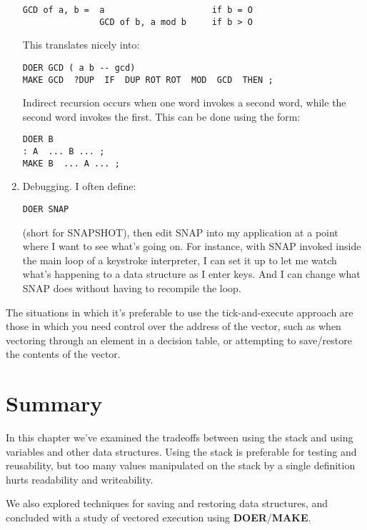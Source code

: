 \begin{enumerate}
\begin{verbatim}
GCD of a, b =  a                     if b = O
               GCD of b, a mod b     if b > O
\end{verbatim}
This translates nicely into:

\begin{verbatim}
DOER GCD ( a b -- gcd)
MAKE GCD  ?DUP  IF  DUP ROT ROT  MOD  GCD  THEN ;
\end{verbatim}
Indirect recursion occurs when one word invokes a second word, while the
second word invokes the first. This can be done using the form:

\begin{verbatim}
DOER B
: A  ... B ... ;
MAKE B  ... A ... ;
\end{verbatim}

\item Debugging. I often define:

\begin{verbatim}
DOER SNAP
\end{verbatim}
(short for SNAPSHOT), then edit SNAP into my application at a point
where I want to see what's going on. For instance, with SNAP invoked inside
the main loop of a keystroke interpreter, I can set it up to let me watch
what's happening to a data structure as I enter keys. And I can change
what SNAP does without having to recompile the loop.
\end{enumerate}


The situations in which it's preferable to use the tick-and-execute approach
are those in which you need control over the address of the vector,
such as when vectoring through an element in a decision table, or
attempting to save/restore the contents of the vector.

\section{Summary}

In this chapter we've examined the tradeoffs between using the stack
and using variables and other data structures. Using the stack is
preferable for testing and reusability, but too many values manipulated
on the stack by a single definition hurts readability and writeability.

We also explored techniques for saving and restoring data structures,
and concluded with a study of vectored execution using \textbf{DOER}/\textbf{MAKE}.

